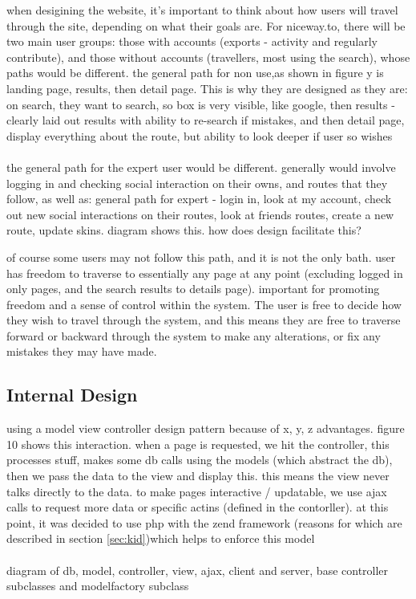 {\color{blue}
	when desigining the website, it's important to think about how users will travel through the site, depending on what their goals are. For niceway.to, there will be two main user groups: those with accounts (exports - activity and regularly contribute), and those without accounts (travellers, most using the search), whose paths would be different.
}
{\color{blue}	
the general path for non use,as shown in figure y is landing page, results, then detail page. This is why they are designed as they are: on search, they want to search, so box is very visible, like google, then results  - clearly laid out results with ability to re-search if mistakes, and then detail page, display everything about the route, but ability to look deeper if user so wishes\ \\
\ \\
the general path for the expert user would be different. generally would involve logging in and checking social interaction on their owns, and routes that they follow, as well as: general path for expert - login in, look at my account, check out new social interactions on their routes, look at friends routes, create a new route, update skins. diagram shows this. how does design facilitate this?
}

{\color{blue} 
	of course some users may not follow this path, and it is not the only bath. user has freedom to traverse to essentially any page at any point (excluding logged in only pages, and the search results to details page). important for promoting freedom and a sense of control within the system. The user is free to decide how they wish to travel through the system, and this means they are free to traverse forward or backward through the system to make any alterations, or fix any mistakes they may have made.
}

\subsection{Internal Design}
{\color{blue} 
	using a model view controller design pattern because of x, y, z advantages. figure 10 shows this interaction. when a page is requested, we hit the controller, this processes stuff, makes some db calls using the models (which abstract the db), then we pass the data to the view and display this. this means the view never talks directly to the data. to make pages interactive / updatable, we use ajax calls to request more data or specific actins (defined in the contorller). at this point, it was decided to use php with the zend framework (reasons for which are described in section \ref{sec:kid})which helps to enforce this model\ \\
	\ \\
	diagram of db, model, controller, view, ajax, client and server, base controller subclasses and modelfactory subclass
}


